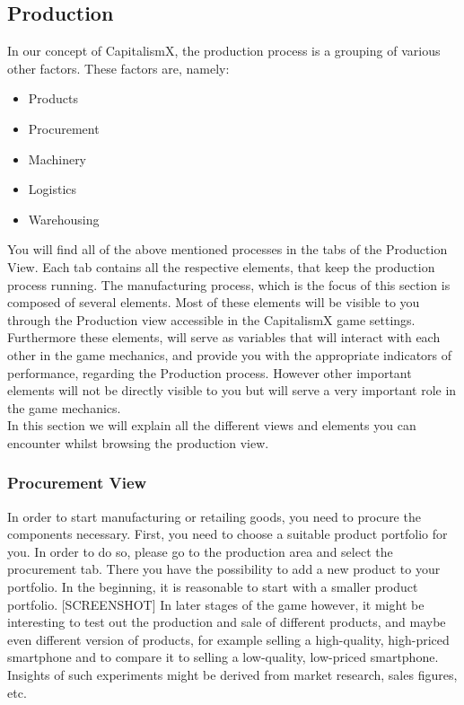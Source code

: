 \subsection{Production}
\label{production_manual}

In our concept of CapitalismX, the production process is a grouping of various other factors. These factors are, namely: 
\begin{itemize} 
\item Products 
\item Procurement  
\item Machinery 
\item Logistics 
\item Warehousing 
\end{itemize}
You will find all of the above mentioned processes in the tabs of the Production View. Each tab contains all the respective elements, that keep the production process running.
The manufacturing process, which is the focus of this section is composed of several elements. Most of these elements will be visible to you through the Production view accessible in the CapitalismX game settings. Furthermore these elements, will serve as variables that will interact with each other in the game mechanics, and provide you with the appropriate indicators of performance, regarding the Production process. However other important elements will not be directly visible to you but will serve a very important role in the game mechanics. \\
In this section we will explain all the different views and elements you can encounter whilst browsing the production view.

\subsubsection{Procurement View}
\label{sub:ProcurementView}
In order to start manufacturing or retailing goods, you need to procure the components necessary. First, you need to choose a suitable product portfolio for you. In order to do so, please go to the production area and select the procurement tab. There you have the possibility to add a new product to your portfolio. In the beginning, it is reasonable to start with a smaller product portfolio. [SCREENSHOT] In later stages of the game however, it might be interesting to test out the production and sale of different products, and maybe even different version of products, for example selling a high-quality, high-priced smartphone and to compare it to selling a low-quality, low-priced smartphone. Insights of such experiments might be derived from market research, sales figures, etc.

